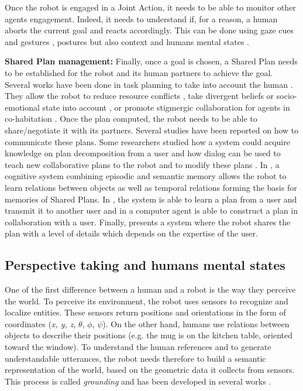 \documentclass[english,a4paper,11pt,twoside]{StyleThese}
\begin{document}
Once the robot is engaged in a Joint Action, it needs to be able to monitor other agents engagement. Indeed, it needs to understand if, for a reason, a human aborts the current goal and reacts accordingly. This can be done using gaze cues and gestures \cite{rich2010recognizing}, postures \cite{sanghvi2011automatic} but also context and humans mental states \cite{salam2015multi}.

\bigskip
\textbf{Shared Plan management:} Finally, once a goal is chosen, a Shared Plan needs to be established for the robot and its human partners to achieve the goal. Several works have been done in task planning to take into account the human \cite{cirillo2010human,Lallement2014hatp}. They allow the robot to reduce resource conflicts \cite{chakraborti2016planning}, take divergent beliefs \cite{warnier2012robot,talamadupula2014coordination} or socio-emotional state \cite{charisi2017planning} into account , or promote stigmergic collaboration for agents in co-habitation \cite{chakraborti2015planning}.  Once the plan computed, the robot needs to be able to share/negotiate it with its partners. Several studies have been reported on how to communicate these plans. Some researchers studied how a system could acquire knowledge on plan decomposition from a user \cite{Mohseni2015} and how dialog can be used to teach new collaborative plans to the robot and to modify these plans \cite{petit2013coordinating}. In \cite{pointeau2014successive}, a cognitive system combining episodic and semantic memory allows the robot to learn relations between objects as well as temporal relations forming the basis for memories of Shared Plans. In \cite{sorce2015proof}, the system is able to learn a plan from a user and transmit it to another user and in \cite{allen2002human} a computer agent is able to construct a plan in collaboration with a user. Finally, \cite{milliez2016using} presents a system where the robot shares the plan with a level of details which depends on the expertise of the user.

\subsection{Perspective taking and humans mental states}

\label{subsec:perspective_taking}

One of the first difference between a human and a robot is the way they perceive the world. To perceive its environment, the robot uses sensors to recognize and localize entities. These sensors return positions and orientations in the form of coordinates (\textit{x, y, z}, $\theta$, $\phi$, $\psi$). On the other hand, humans use relations between objects to describe their positions (e.g. the mug is on the kitchen table, oriented toward the window). To understand the human references and to
generate understandable utterances, the robot needs therefore
to build a semantic representation of the world, based on the
geometric data it collects from sensors. This process is called \textit{grounding} and has been developed in several works \cite{coradeschi2003introduction, mavridis2005grounded, lemaignan2012grounding}.
\end{document}
